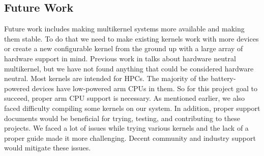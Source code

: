 \documentclass[11pt]{article}       %
\begin{document}
\subsection{Future Work}
Future work includes making multikernel systems more available and making them stable. To do that we need to make existing kernels work with more devices or create a new configurable kernel from the ground up with a large array of hardware support in mind. Previous work in \cite{DEL02} talks about hardware neutral multikernel, but we have not found anything that could be considered hardware neutral. Most kernels are intended for HPCs. The majority of the battery-powered devices have low-powered arm CPUs in them. So for this project goal to succeed, proper arm CPU support is necessary. As mentioned earlier, we also faced difficulty compiling some kernels on our system. In addition, proper support documents would be beneficial for trying, testing, and contributing to these projects. We faced a lot of issues while trying various kernels and the lack of a proper guide made it more challenging. Decent community and industry support would mitigate these issues. 





\end{document}
